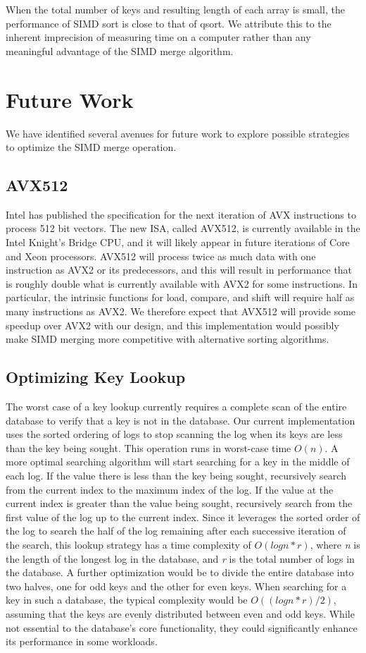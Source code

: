 \documentclass[10pt,twocolumn]{article}
\begin{document}
When the total number of keys and resulting length of each array is small, the performance of SIMD sort is close to that of qsort.  We attribute this to the inherent imprecision of measuring time on a computer rather than any meaningful advantage of the SIMD merge algorithm.

\section{Future Work}
We have identified several avenues for future work to explore possible strategies to optimize the SIMD merge operation.

\subsection{AVX512}
Intel has published the specification for the next iteration of AVX instructions to process 512 bit vectors.  The new ISA, called AVX512, is currently available in the Intel Knight's Bridge CPU, and it will likely appear in future iterations of Core and Xeon processors.  AVX512 will process twice as much data with one instruction as AVX2 or its predecessors, and this will result in performance that is roughly double what is currently available with AVX2 for some instructions.  In particular, the intrinsic functions for load, compare, and shift will require half as many instructions as AVX2.  We therefore expect that AVX512 will provide some speedup over AVX2 with our design, and this implementation would possibly make SIMD merging more competitive with alternative sorting algorithms.

\subsection{Optimizing Key Lookup}
The worst case of a key lookup currently requires a complete scan of the entire database to verify that a key is not in the database.  Our current implementation uses the sorted ordering of logs to stop scanning the log when its keys are less than the key being sought.  This operation runs in worst-case time $O(n)$.  A more optimal searching algorithm will start searching for a key in the middle of each log.  If the value there is less than the key being sought, recursively search from the current index to the maximum index of the log.  If the value at the current index is greater than the value being sought, recursively search from the first value of the log up to the current index.   Since it leverages the sorted order of the log to search the half of the log remaining after each successive iteration of the search, this lookup strategy has a time complexity of $O(\textit{log}n * r)$, where \textit{n} is the length of the longest log in the database, and \textit{r} is the total number of logs in the database.  A further optimization would be to divide the entire database into two halves, one for odd keys and the other for even keys.  When searching for a key in such a database, the typical complexity would be $O((\textit{log}n * r)/2)$, assuming that the keys are evenly distributed between even and odd keys.  While not essential to the database's core functionality, they could significantly enhance its performance in some workloads.
\end{document}
